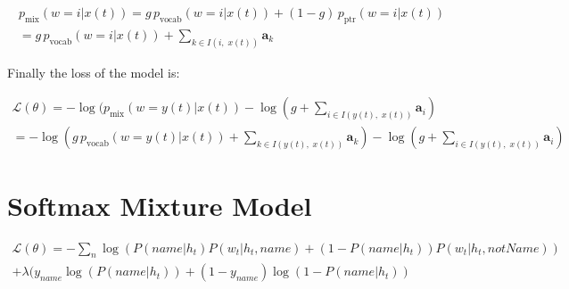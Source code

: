 \begin{equation}
	\begin{gathered}
		p_{\text{mix}}(w=i|x(t)) = g \, p_{\text{vocab}}(w=i|x(t)) + (1-g) \, p_{\text{ptr}}(w=i|x(t)) \\
		= g \, p_{\text{vocab}}(w=i|x(t)) + \sum_{k \in I(i, \; x(t))}\mathbf{a}_k
	\end{gathered}
\end{equation}

Finally the loss of the model is:

\begin{equation}
	\begin{gathered}
		\mathcal{L}(\theta) = -\log(p_{\text{mix}}(w=y(t)|x(t)) -\log(g + \sum_{i \in I(y(t), \; x(t))}\mathbf{a}_i) \\
		= -\log(g \, p_{\text{vocab}}(w=y(t)|x(t)) + \sum_{k \in I(y(t), \; x(t))}\mathbf{a}_k) -\log(g + \sum_{i \in I(y(t), \; x(t))}\mathbf{a}_i)
	\end{gathered}
\end{equation}

\section{Softmax Mixture Model}
\label{sec:mixtureModel}

\begin{equation}
	\begin{gathered}
		\mathcal{L}(\theta) = -\sum_{n} \log(P(name|h_t)P(w_t|h_t, name) + (1-P(name|h_t))P(w_t|h_t, notName)) \\
		+ \lambda(y_{name}\log(P(name|h_t)) + (1 - y_{name})\log(1-P(name|h_t)) \\
	\end{gathered}
\end{equation}

